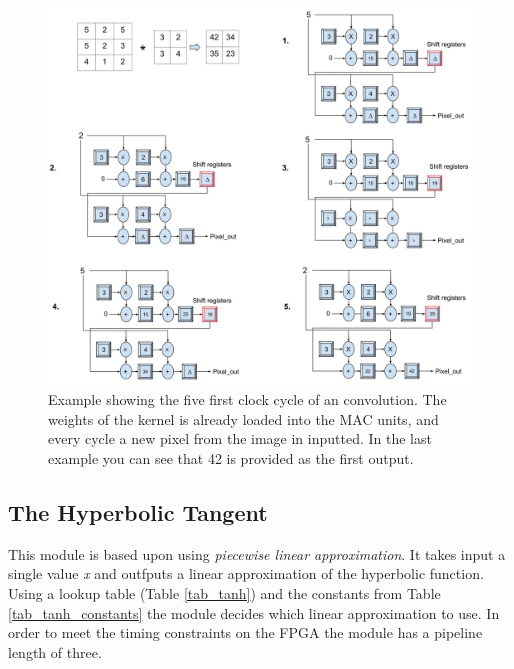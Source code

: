 \begin{figure}[h!]
  \centering
      \includegraphics[width=1.1\textwidth]{Figures/Method/Conv_example}
  \caption[Convolution example]{Example showing the five first clock cycle of an convolution. The weights of the kernel is already loaded into the MAC units, and every cycle a new pixel from the image in inputted. In the last example you can see that 42 is provided as the first output.}
\end{figure}

\subsection{The Hyperbolic Tangent} 

This module is based upon \cite{XXXXXXXXXX} using \textit{piecewise linear approximation}. It takes input a single value \textit{x} and outfputs a linear approximation of the hyperbolic function. Using a lookup table (Table \ref{tab_tanh}) and the constants from Table \ref{tab_tanh_constants} the module decides which linear approximation to use. 
In order to meet the timing constraints on the FPGA the module has a pipeline length of three. 

